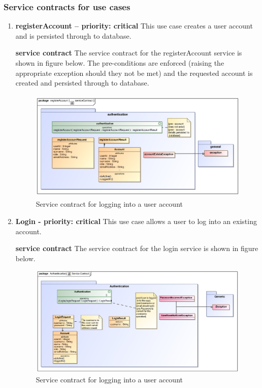 \documentclass[12pt]{article}
\begin{document}
\newpage
\subsubsection{Service contracts for use cases}

\begin{enumerate}


\item \textbf{registerAccount  – priority: critical } 
This use case creates  a user account and is persisted through to database.

\par{\textbf{service contract} The service contract for the registerAccount  service is shown in figure below. The pre-conditions are enforced (raising the appropriate exception should they not be met) and the requested account is created and persisted through to database.}
\begin{figure}[h]
		\includegraphics[height=200px, width=500px]{epsImages/Authentication/serviceContract.eps}
		\caption{Service contract for logging into a user account}
\end{figure}
\item \textbf{Login - priority: critical}
This use case allows a user to log into an existing account.

\par{\textbf{service contract} The service contract for the login service is shown in figure below.}
\begin{figure}[h]
		\includegraphics[height=200px, width=500px]{epsImages/Authentication/LoginServiceContract.eps}
		\caption{Service contract for logging into a user account}
\end{figure}


\end{enumerate}
\end{document}
